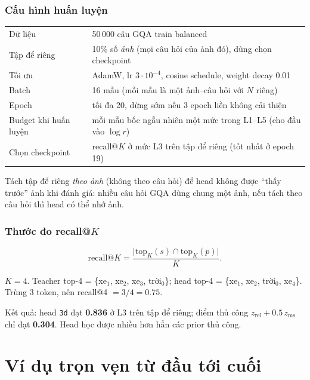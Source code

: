 \documentclass[11pt,a4paper]{article}
\begin{document}
\subsubsection*{Cấu hình huấn luyện}
\begin{center}
\begin{tabular}{@{}ll@{}}
\toprule
Dữ liệu & 50\,000 câu GQA train balanced\\
Tập để riêng & 10\% số \emph{ảnh} (mọi câu hỏi của ảnh đó), dùng chọn checkpoint\\
Tối ưu & AdamW, lr $3\cdot10^{-4}$, cosine schedule, weight decay 0.01\\
Batch & 16 mẫu (mỗi mẫu là một ảnh--câu hỏi với $N$ riêng)\\
Epoch & tối đa 20, dừng sớm nếu 3 epoch liền không cải thiện\\
Budget khi huấn luyện & mỗi mẫu bốc ngẫu nhiên một mức trong L1--L5 (cho đầu vào $\log r$)\\
Chọn checkpoint & recall@$K$ ở mức L3 trên tập để riêng (tốt nhất ở epoch 19)\\
\bottomrule
\end{tabular}
\end{center}

\begin{visao}
Tách tập để riêng \emph{theo ảnh} (không theo câu hỏi) để head không được ``thấy trước'' ảnh khi đánh giá: nhiều câu hỏi GQA dùng chung một ảnh, nếu tách theo câu hỏi thì head có thể nhớ ảnh.
\end{visao}

\subsubsection*{Thước đo recall@$K$}
\begin{equation}
\mathrm{recall@}K=\frac{\big|\mathrm{top}_K(s)\cap\mathrm{top}_K(p)\big|}{K}.
\end{equation}
\begin{vidu}
$K=4$. Teacher top-4 = \{xe$_1$, xe$_2$, xe$_3$, trời$_0$\}; head top-4 = \{xe$_1$, xe$_2$, trời$_0$, xe$_4$\}. Trùng 3 token, nên recall@4 $=3/4=0.75$.
\end{vidu}
Kết quả: head \texttt{3d} đạt \textbf{0.836} ở L3 trên tập để riêng; điểm thủ công $z_\text{rel}+0.5\,z_\text{ms}$ chỉ đạt \textbf{0.304}. Head học được nhiều hơn hẳn các prior thủ công.

\section{Ví dụ trọn vẹn từ đầu tới cuối}
\label{sec:full}
\end{document}
